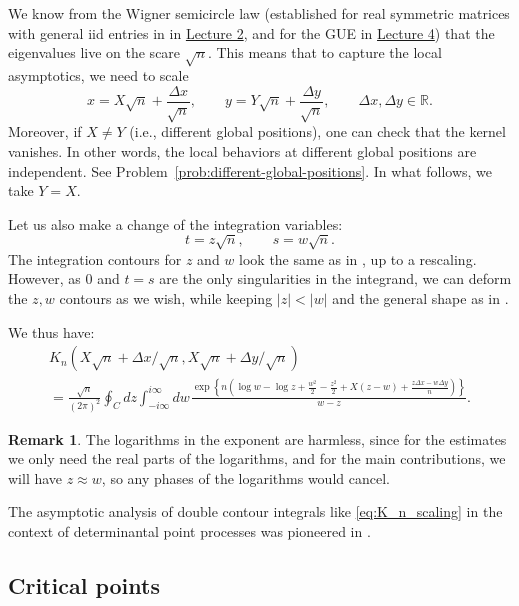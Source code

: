 \documentclass[letterpaper,11pt,oneside,reqno]{article}
\numberwithin{equation}{section}
\newcommand{\ssp}{\hspace{1pt}}
\theoremstyle{definition}
\newtheorem{remark}[proposition]{Remark}
\begin{document}
We know from the Wigner semicircle law
(established for real symmetric matrices with general iid entries in
in \href{https://lpetrov.cc/rmt25/rmt25-notes/rmt2025-l02.pdf}{Lecture 2},
and for the GUE in \href{https://lpetrov.cc/rmt25/rmt25-notes/rmt2025-l04.pdf}{Lecture 4})
that the eigenvalues live on the scare $\sqrt n$. This means that to capture the local asymptotics,
we need to scale
\begin{equation}
	\label{eq:scaling_x-y}
	x=X\sqrt n+\frac{\Delta x}{\sqrt n},\qquad y=Y\sqrt n+\frac{\Delta y}{\sqrt n},\qquad
	\Delta x,\Delta y\in\mathbb{R}.
\end{equation}
Moreover, if $X\ne Y$ (i.e., different global positions), one can check that the kernel
vanishes. In other words, the local behaviors at different global positions are independent.
See Problem~\ref{prob:different-global-positions}.
In what follows, we take $Y=X$.

Let us also make a change of the integration variables:
\begin{equation*}
	t=z\sqrt n,\qquad s=w\sqrt n.
\end{equation*}
The integration contours for $z$ and $w$ look the same as in
, up to a rescaling. However, as $0$
and $t=s$
are the only singularities in the integrand, we can deform the $z,w$
contours as we wish, while keeping $|z|<|w|$
and the general shape as in .

We thus have:
\begin{multline}
	\label{eq:K_n_scaling}
	K_n(X\sqrt n+\Delta x/\sqrt n,X\sqrt n+\Delta y/\sqrt n)\\=
	\frac{\sqrt n}{(2\pi)^2}
	\oint_C dz\int_{-i\infty}^{i\infty}dw\ssp
	\frac{\exp
		\left\{
			n\left(
				\log w -\log z
				+\frac{w^2}{2}-\frac{z^2}{2}
				+X(z-w)+\frac{z \Delta x-w \Delta y}{n}
			\right)
		\right\}
	}{w-z}.
\end{multline}
\begin{remark}
	\label{rmk:log-harmless}
	The logarithms in the exponent are harmless, since for the
	estimates we only need the real parts of the logarithms,
	and for the main contributions, we will have $z\approx w$, so
	any phases of the logarithms would cancel.
\end{remark}

The asymptotic analysis of double contour integrals like
\eqref{eq:K_n_scaling} in the context of determinantal point processes
was pioneered in \cite[Section~3]{Okounkov2002}.

\subsection{Critical points}
\label{sub:critical-points}
\end{document}
